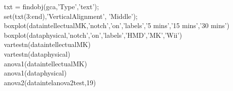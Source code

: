 txt = findobj(gca,'Type','text');\\
set(txt(3:end),'VerticalAlignment', 'Middle');\\
boxplot(dataintellectualMK,'notch','on','labels',{'5 mins','15 mins','30 mins'})\\
boxplot(dataphysical,'notch','on','labels',{'HMD','MK','Wii'})\\
vartestn(dataintellectualMK)\\
vartestn(dataphysical)\\
anova1(dataintellectualMK)\\
anova1(dataphysical)\\
anova2(dataintelanova2test,19)\\
